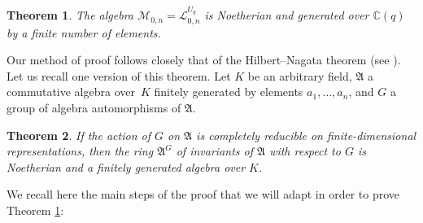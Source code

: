 \documentclass[pdftex]{sigma}
\numberwithin{equation}{section}
\newtheorem{teo}{Theorem}[section]
\theoremstyle{definition}
\newcommand{\Mm}{{\mathcal M}}
\begin{document}
\begin{teo}\label{MonNoeth} The algebra $\Mm_{0,n} = {\mathcal L}_{0,n}^{U_q}$ is Noetherian and generated over ${\mathbb C}(q)$ by a finite number of elements.
\end{teo}
Our method of proof follows closely that of the Hilbert--Nagata theorem (see \cite{DC}). Let us recall one version of this theorem. Let $K$ be an arbitrary field, $\mathfrak{A}$ a commutative algebra over~$K$ finitely generated by elements $a_1,\dots,a_n$, and $G$ a group of algebra automorphisms of $\mathfrak{A}$.
\begin{teo} If the action of $G$ on $\mathfrak{A}$ is completely reducible on finite-dimensional representations, then the ring $\mathfrak{A}^G$ of invariants of $\mathfrak{A}$ with respect to $G$ is Noetherian and a finitely generated algebra over $K$.
\end{teo}
We recall here the main steps of the proof that we will adapt in order to prove Theorem \ref{MonNoeth}:
\end{document}
